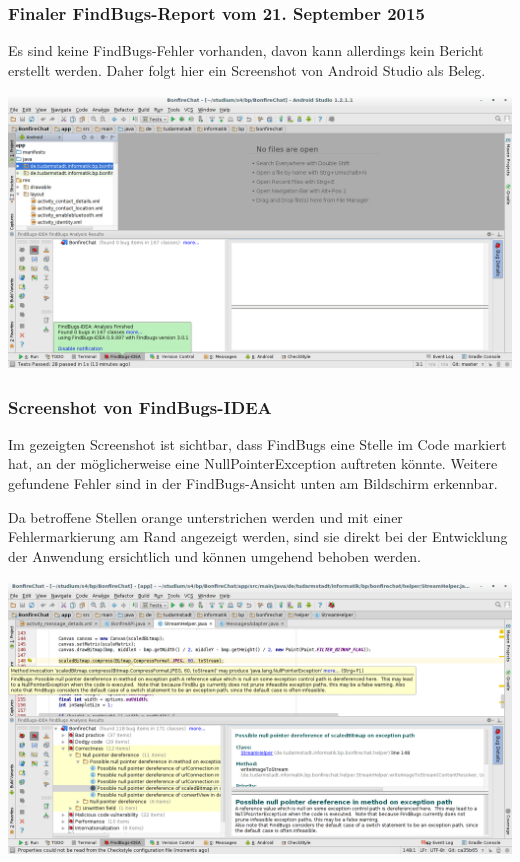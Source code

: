 \subsubsection{Finaler FindBugs-Report vom 21. September 2015}


Es sind keine FindBugs-Fehler vorhanden, davon kann allerdings kein Bericht erstellt werden. Daher folgt hier ein Screenshot von Android Studio als Beleg.

\includegraphics[width=17.5cm]{belege/findbugs/findbugs-no-warnings-screenshot.png}


\clearpage
\subsubsection{Screenshot von FindBugs-IDEA}

Im gezeigten Screenshot ist sichtbar, dass FindBugs eine Stelle im Code markiert hat, an der möglicherweise eine NullPointerException auftreten könnte. Weitere gefundene Fehler sind in der FindBugs-Ansicht unten am Bildschirm erkennbar.

Da betroffene Stellen orange unterstrichen werden und mit einer Fehlermarkierung am Rand angezeigt werden, sind sie direkt bei der Entwicklung der Anwendung ersichtlich und können umgehend behoben werden.

\includegraphics[width=17.5cm]{belege/findbugs/findbugs-idea-screenshot.png}

